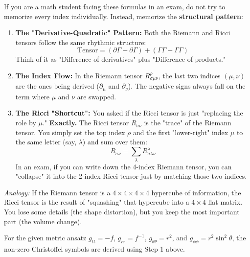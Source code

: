 \begin{solution}
If you are a math student facing these formulas in an exam, do not try to memorize every index individually. Instead, memorize the \textbf{structural pattern}:
\begin{enumerate}
    \item \textbf{The "Derivative-Quadratic" Pattern:} Both the Riemann and Ricci tensors follow the same rhythmic structure:
    \begin{equation*}
        \text{Tensor} = (\partial \Gamma - \partial \Gamma) + (\Gamma\Gamma - \Gamma\Gamma)
    \end{equation*}
    Think of it as "Difference of derivatives" plus "Difference of products." 
    \item \textbf{The Index Flow:} In the Riemann tensor $R^\rho_{\sigma\mu\nu}$, the last two indices $(\mu, \nu)$ are the ones being derived ($\partial_\mu$ and $\partial_\nu$). The negative signs always fall on the term where $\mu$ and $\nu$ are swapped.
    \item \textbf{The Ricci "Shortcut":} You asked if the Ricci tensor is just "replacing the role by $\mu$." \textbf{Exactly.} The Ricci tensor $R_{\sigma\nu}$ is the "trace" of the Riemann tensor. You simply set the top index $\rho$ and the first "lower-right" index $\mu$ to the same letter (say, $\lambda$) and sum over them:
    \begin{equation*}
        R_{\sigma\nu} = \sum_{\lambda} R^\lambda_{\sigma\lambda\nu}
    \end{equation*}
    In an exam, if you can write down the 4-index Riemann tensor, you can "collapse" it into the 2-index Ricci tensor just by matching those two indices.
\end{enumerate}
\textit{Analogy:} If the Riemann tensor is a $4 \times 4 \times 4 \times 4$ hypercube of information, the Ricci tensor is the result of "squashing" that hypercube into a $4 \times 4$ flat matrix. You lose some details (the shape distortion), but you keep the most important part (the volume change).

For the given metric ansatz $g_{tt} = -f$, $g_{rr} = f^{-1}$, $g_{\theta\theta} = r^2$, and $g_{\phi\phi} = r^2 \sin^2\theta$, the non-zero Christoffel symbols are derived using Step 1 above. 


\end{solution}
